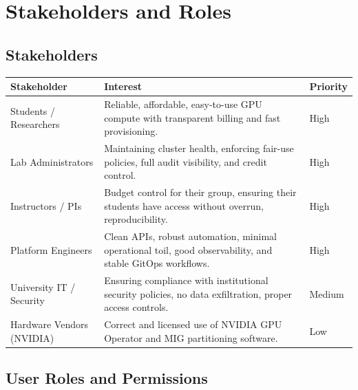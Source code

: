 \documentclass[12pt,a4paper]{article}
\begin{document}
\newpage
\section{Stakeholders and Roles}

\subsection{Stakeholders}

\begin{tabularx}{\textwidth}{@{}L{3.5cm}X L{2.5cm}@{}}
  \textbf{Stakeholder} & \textbf{Interest} & \textbf{Priority} \\
  \midrule
  Students / Researchers
    & Reliable, affordable, easy-to-use GPU compute with transparent billing and fast provisioning.
    & High \\
  Lab Administrators
    & Maintaining cluster health, enforcing fair-use policies, full audit visibility, and credit control.
    & High \\
  Instructors / PIs
    & Budget control for their group, ensuring their students have access without overrun, reproducibility.
    & High \\
  Platform Engineers
    & Clean APIs, robust automation, minimal operational toil, good observability, and stable GitOps workflows.
    & High \\
  University IT / Security
    & Ensuring compliance with institutional security policies, no data exfiltration, proper access controls.
    & Medium \\
  Hardware Vendors (NVIDIA)
    & Correct and licensed use of NVIDIA GPU Operator and MIG partitioning software.
    & Low \\
\end{tabularx}

\subsection{User Roles and Permissions}
\end{document}
